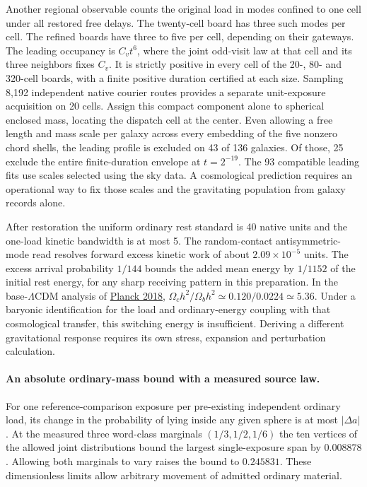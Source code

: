\documentclass[11pt]{article}
\begin{document}
Another regional observable counts the original load in modes confined to
one cell under all restored free delays. The twenty-cell board has three
such modes per cell. The refined boards have three to five per cell,
depending on their gateways. The leading occupancy is $C_v t^6$,
where the joint odd-visit law at that cell and its three neighbors fixes
$C_v$. It is strictly positive in every cell of the 20-, 80- and
320-cell boards, with a finite positive duration certified at each size.
Sampling 8,192 independent native courier routes provides a separate
unit-exposure acquisition on 20 cells. Assign this compact component
alone to spherical enclosed mass, locating the dispatch cell at the
center. Even allowing a free length and mass scale per galaxy across
every embedding of the five nonzero chord shells, the leading profile
is excluded on 43 of 136 galaxies. Of those, 25 exclude the entire
finite-duration envelope at $t=2^{-19}$. The 93 compatible leading fits
use scales selected using the sky data. A cosmological prediction
requires an operational way to fix those scales and the gravitating
population from galaxy records alone.

After restoration the uniform ordinary rest standard is 40 native units
and the one-load kinetic bandwidth is at most 5. The random-contact
antisymmetric-mode read resolves forward excess kinetic work of about
$2.09\times10^{-5}$ units. The excess arrival probability $1/144$ bounds
the added mean energy by $1/1152$ of the initial rest energy, for any
sharp receiving pattern in this preparation. In the base-$\Lambda$CDM
analysis of \href{https://arxiv.org/abs/1807.06209}{Planck 2018},
$\Omega_c h^2/\Omega_b h^2 \simeq 0.120/0.0224\simeq 5.36$.
Under a baryonic identification for the load and ordinary-energy
coupling with that cosmological transfer, this switching energy is
insufficient. Deriving a different gravitational response requires
its own stress, expansion and perturbation calculation.

\paragraph{An absolute ordinary-mass bound with a measured source law.}
For one reference-comparison exposure per pre-existing independent
ordinary load, its change in the probability of lying inside any given
sphere is at most $|\Delta a|$. At the measured three word-class marginals
$(1/3,1/2,1/6)$ the ten vertices of the allowed joint distributions
bound the largest single-exposure span by $0.008878$. Allowing both
marginals to vary raises the bound to $0.245831$. These dimensionless
limits allow arbitrary movement of admitted ordinary material.
\end{document}
